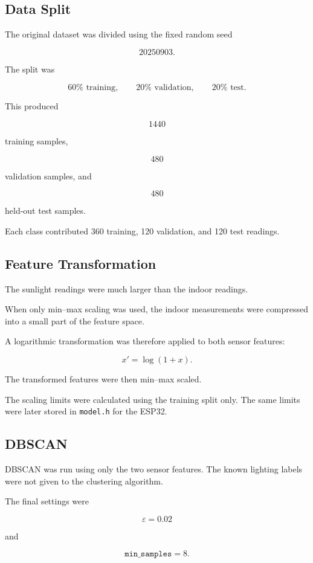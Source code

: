 \documentclass[10pt,a4paper,twocolumn]{article}
\begin{document}
\subsection{Data Split}

The original dataset was divided using the fixed random seed

\[
20250903.
\]

The split was

\[
60\% \text{ training},
\qquad
20\% \text{ validation},
\qquad
20\% \text{ test}.
\]

This produced

\[
1440
\]

training samples,

\[
480
\]

validation samples, and

\[
480
\]

held-out test samples.

Each class contributed 360 training, 120 validation, and 120 test readings.


\subsection{Feature Transformation}

The sunlight readings were much larger than the indoor readings.

When only min--max scaling was used, the indoor measurements were compressed
into a small part of the feature space.

A logarithmic transformation was therefore applied to both sensor features:

\[
x'=\log(1+x).
\]

The transformed features were then min--max scaled.

The scaling limits were calculated using the training split only. The same
limits were later stored in \texttt{model.h} for the ESP32.


\subsection{DBSCAN}

DBSCAN was run using only the two sensor features. The known lighting labels
were not given to the clustering algorithm.

The final settings were

\[
\varepsilon=0.02
\]

and

\[
\texttt{min\_samples}=8.
\]
\end{document}
